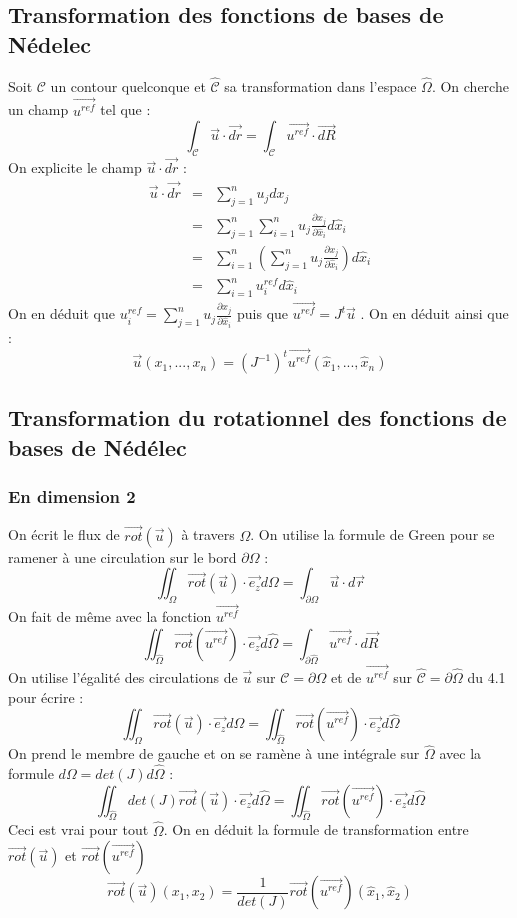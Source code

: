 \documentclass[a4paper,12pt]{article}
\begin{document}
\subsection{Transformation des fonctions de bases de Nédelec}
Soit $\mathcal{C}$ un contour quelconque et $\hat{\mathcal{C}}$ sa transformation dans l'espace $\hat{\Omega}$.
On cherche un champ $\vec{u^{ref}}$ tel que :
\[
\int_{\mathcal{C}} {\vec{u}\cdot\vec{dr}} = \int_{\hat{\mathcal{C}}} {\vec{u^{ref}}\cdot\vec{dR}}
\]
On explicite le champ $\vec{u}\cdot\vec{dr}$ :
\begin{eqnarray*}
\vec{u}\cdot\vec{dr} &=& \sum_{j=1}^{n} {u_{j}dx_{j}} \\
&=& \sum_{j=1}^{n} \sum_{i=1}^{n} u_{j} \frac{\partial{x}_{j}}{\partial\hat{x}_{i}}d\hat{x}_{i} \\
&=& \sum_{i=1}^{n} \left( \sum_{j=1}^{n} u_{j} \frac{\partial{x}_{j}}{\partial\hat{x}_{i}} \right) d\hat{x}_{i} \\
&=& \sum_{i=1}^{n} u^{ref}_{i} d\hat{x}_{i}
\end{eqnarray*}
On en déduit que $u^{ref}_{i} = \sum_{j=1}^{n} u_{j} \frac{\partial{x}_{j}}{\partial\hat{x}_{i}}$ puis que $\vec{u^{ref}} = J^{t}\vec{u}$
. On en déduit ainsi que : 
$$\boxed{\vec{u} (x_{1},...,x_{n})= (J^{-1})^{t}\vec{u^{ref}}(\hat{x}_{1},...,\hat{x}_{n})}$$

\subsection{Transformation du rotationnel des fonctions de bases de Nédélec}
\subsubsection{En dimension 2}
On écrit le flux de $\vec{rot}(\vec{u})$ à travers $\Omega$. On utilise la formule de Green pour se ramener à une circulation sur le bord
$\partial \Omega$ : 
\[
\iint_{\Omega} {\vec{rot}(\vec{u}) \cdot \vec{e_{z}} d\Omega} = \int_{\partial \Omega}{\vec{u} \cdot d\vec{r}}
\]
On fait de même avec la fonction $\vec{u^{ref}}$
\[
\iint_{\hat{\Omega}} {\vec{rot}(\vec{u^{ref}}) \cdot \vec{e_{z}} d\hat{\Omega}} = \int_{\partial \hat{\Omega}}{\vec{u^{ref}} \cdot d\vec{R}}
\]
On utilise l'égalité des circulations de $\vec{u}$ sur $\mathcal{C}=\partial\Omega$ 
et de $\vec{u^{ref}}$ sur $\hat{\mathcal{C}} = \partial \hat{\Omega}$ du 4.1 pour écrire :
\[
\iint_{\Omega} {\vec{rot}(\vec{u}) \cdot\vec{e_{z}} d\Omega} = \iint_{\hat{\Omega}} {\vec{rot}(\vec{u^{ref}}) \cdot \vec{e_{z}} d\hat{\Omega}}
\]
On prend le membre de gauche et on se ramène à une intégrale sur $\hat{\Omega}$ avec la formule $d\Omega = det(J)d\hat{\Omega}$ :
\[
\iint_{\hat{\Omega}} {det(J) \vec{rot}(\vec{u}) \cdot \vec{e_{z}} d\hat{\Omega}} = \iint_{\hat{\Omega}} {\vec{rot}(\vec{u^{ref}}) \cdot \vec{e_{z}} d\hat{\Omega}}
\]
Ceci est vrai pour tout $\hat{\Omega}$. On en déduit la formule de transformation entre $\vec{rot}(\vec{u})$ et $\vec{rot}(\vec{u^{ref}})$
$$\boxed{\vec{rot}(\vec{u})(x_{1},x_{2}) = \frac{1}{det(J)}\vec{rot}(\vec{u^{ref}})(\hat{x}_{1},\hat{x}_{2})}$$
\end{document}
